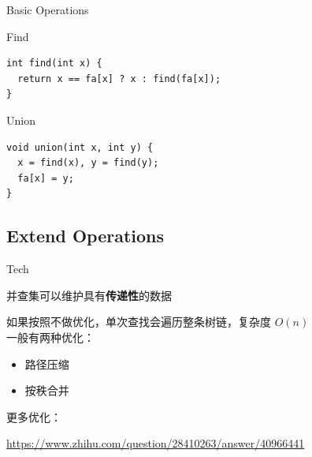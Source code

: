 \documentclass{beamer}
\begin{document}
\begin{frame}[fragile]{Basic Operations}
  \begin{block}{Find}
    \begin{lstlisting}
int find(int x) {
  return x == fa[x] ? x : find(fa[x]);
}
    \end{lstlisting}
  \end{block}

  \begin{block}{Union}
    \begin{lstlisting}
void union(int x, int y) {
  x = find(x), y = find(y);
  fa[x] = y;
}
    \end{lstlisting}
  \end{block}
\end{frame}

\subsection{Extend Operations}

\begin{frame}{Tech}

  并查集可以维护具有\textbf{传递性}的数据

  如果按照不做优化，单次查找会遍历整条树链，复杂度 $O(n)$
  ~\\

  一般有两种优化：

  \begin{itemize}
    \item 路径压缩
    \item 按秩合并
  \end{itemize}

  更多优化：
  
  \url{https://www.zhihu.com/question/28410263/answer/40966441}

\end{frame}
\end{document}
